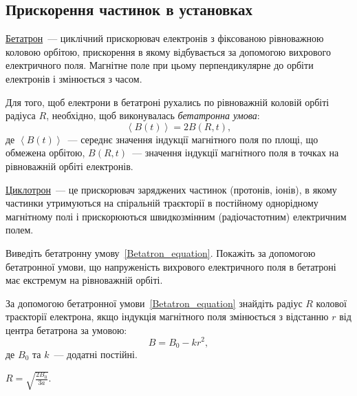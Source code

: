 \subsection*{Прискорення частинок в установках}

\begin{Theory}
\href{http://nuclphys.sinp.msu.ru/experiment/accelerators/betatron.htm}{Бетатрон}~--- циклічний  прискорювач електронів з фіксованою рівноважною коловою орбітою, прискорення в якому відбувається за допомогою вихрового електричного поля. Магнітне поле при цьому перпендикулярне до орбіти електронів і змінюється з часом.

Для того, щоб електрони в бетатроні рухались по рівноважній коловій орбіті радіуса $R$, необхідно, щоб виконувалась \emph{бетатронна умова}:
\begin{equation}\label{Betatron_equation}
	\left\langle B(t)\right\rangle  = 2 B(R,t),
\end{equation}
де $\left\langle B(t)\right\rangle$~--- середнє значення індукції магнітного поля по площі, що обмежена орбітою,  $B(R,t)$~--- значення індукції магнітного поля в точках на рівноважній орбіті електронів. 

\href{http://nuclphys.sinp.msu.ru/experiment/accelerators/ciclotron.htm}{Циклотрон}~--- це прискорювач заряджених частинок (протонів, іонів), в якому частинки  утримуються на спіральній траєкторії в постійному  однорідному магнітному полі і прискорюються швидкозмінним (радіочастотним) електричним полем.
\end{Theory}

\begin{problem}
   Виведіть бетатронну умову~\ref{Betatron_equation}. Покажіть за допомогою бетатронної умови, що напруженість вихрового електричного поля в бетатроні має екстремум на рівноважній орбіті.
\end{problem}

\begin{problem}
    За допомогою бетатронної умови~\ref{Betatron_equation} знайдіть радіус $R$ колової траєкторії електрона, якщо індукція магнітного поля змінюється з відстанню $r$ від центра бетатрона за умовою:
\[
	B = B_0 - kr^2,
\]
де $B_0$ та $k$~--- додатні постійні.
\begin{solution}
	$R = \sqrt{\frac{2B_0}{3a}}.$
\end{solution}
\end{problem}

